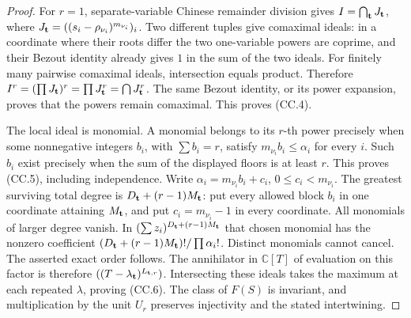 \begin{proof}
For \(r=1\), separate-variable Chinese remainder division gives
\(I=\bigcap_{\bf t}J_{\bf t}\), where
\(J_{\bf t}=((s_i-\rho_{\nu_i})^{m_{\nu_i}})_i\).
Two different tuples give comaximal ideals: in a coordinate where
their roots differ the two one-variable powers are coprime, and their
Bezout identity already gives \(1\) in the sum of the two ideals.
For finitely many pairwise comaximal ideals, intersection equals
product.  Therefore
\(I^r=(\prod J_{\bf t})^r=\prod J_{\bf t}^r=\bigcap J_{\bf t}^r\).
The same Bezout identity, or its power expansion, proves that the
powers remain comaximal.  This proves (CC.4).

The local ideal is monomial.  A monomial belongs to its \(r\)-th
power precisely when some nonnegative integers \(b_i\), with
\(\sum b_i=r\), satisfy \(m_{\nu_i}b_i\leq\alpha_i\) for every \(i\).
Such \(b_i\) exist precisely when the sum of the displayed floors is
at least \(r\).  This proves (CC.5), including independence.
Write \(\alpha_i=m_{\nu_i}b_i+c_i\), \(0\leq c_i<m_{\nu_i}\).
The greatest surviving total degree is
\(D_{\bf t}+(r-1)M_{\bf t}\): put every allowed block \(b_i\)
in one coordinate attaining \(M_{\bf t}\), and put
\(c_i=m_{\nu_i}-1\) in every coordinate.
All monomials of larger degree vanish.  In
\((\sum z_i)^{D_{\bf t}+(r-1)M_{\bf t}}\) that chosen monomial
has the nonzero coefficient
\((D_{\bf t}+(r-1)M_{\bf t})!/\prod\alpha_i!\).
Distinct monomials cannot cancel.  The asserted exact order follows.
The annihilator in \(\mathbb C[T]\) of evaluation on this factor is
therefore \(((T-\lambda_{\bf t})^{L_{{\bf t},r}})\).
Intersecting these ideals takes the maximum at each repeated
\(\lambda\), proving (CC.6).  The class of \(F(S)\) is invariant,
and multiplication by the unit \(U_r\) preserves injectivity and
the stated intertwining.
\end{proof}

